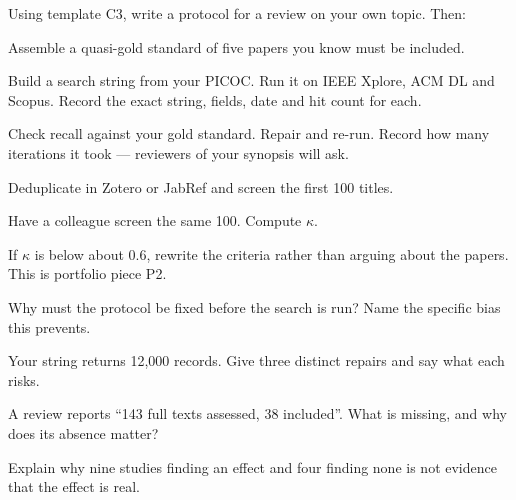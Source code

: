 \begin{lab}
Using template C3, write a protocol for a review on your own topic. Then:

\begin{tightnum}
  \item Assemble a quasi-gold standard of five papers you know must be included.
  \item Build a search string from your PICOC. Run it on IEEE Xplore, ACM DL
    and Scopus. Record the exact string, fields, date and hit count for each.
  \item Check recall against your gold standard. Repair and re-run. Record how
    many iterations it took --- reviewers of your synopsis will ask.
  \item Deduplicate in Zotero or JabRef and screen the first 100 titles.
  \item Have a colleague screen the same 100. Compute $\kappa$.
\end{tightnum}

\medskip
If $\kappa$ is below about 0.6, rewrite the criteria rather than arguing about
the papers. This is portfolio piece P2.
\end{lab}

\begin{checkpoint}
\begin{tightnum}
  \item Why must the protocol be fixed before the search is run? Name the
    specific bias this prevents.
  \item Your string returns 12,000 records. Give three distinct repairs and say
    what each risks.
  \item A review reports ``143 full texts assessed, 38 included''. What is
    missing, and why does its absence matter?
  \item Explain why nine studies finding an effect and four finding none is not
    evidence that the effect is real.
\end{tightnum}
\end{checkpoint}

